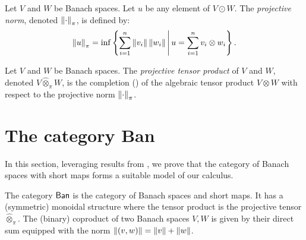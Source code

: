 
\begin{definition} %
  Let $V$ and $W$ be Banach spaces. Let $u$ be any element of $V \odot W$. The \emph{projective norm}, denoted $\left\lVert  \cdot  \right\rVert_{\pi}$,  is defined by: 
  \[
 \left\lVert u \right\rVert_{\pi} = \inf\left\{ \sum_{i=1}^n \left\lVert v_i \right\rVert \left\lVert w_i \right\rVert \Bigg| \, u = \sum_{i=1}^n v_i \otimes w_i\right\}.
\]
\end{definition}


\begin{definition} %
  Let \( V \) and \( W \) be Banach spaces. The \emph{projective tensor product} of \( V \) and \( W \), denoted  $ V \widehat{\otimes}_\pi W$, is the completion (\cite{goubault-larrecqNonHausdorffTopologyDomain2013}) of the algebraic tensor product \( V \otimes W \) with respect to the projective norm \( \left\lVert \cdot \right\rVert_{\pi} \).
\end{definition}







\section{The category Ban}

In this section, leveraging results from \cite{dahlqvist2023syntactic}, we prove that the category of Banach spaces with short maps forms a suitable model of our calculus.

\begin{comment}
\begin{definition}
Let \( x = (x_1, x_2, \dots, x_n) \in \mathbb{C}^n \). The \( L^1 \) norm, \gls{l1_norm},  is defined by
\[
\|x\|_{L^1} = \sum_{i=1}^n |x_i|.
\]
\end{definition}
\end{comment}

\begin{definition}
  The category $\mathsf{Ban}$ is the category of Banach spaces and short maps. It has a (symmetric) monoidal structure  where the tensor product is the projective tensor $\widehat{\otimes}_\pi$.
  The (binary) coproduct of two Banach spaces $V,W$ is given by their direct sum equipped with the norm $\left\lVert (v,w) \right\rVert = \left\lVert v \right\rVert + \left\lVert w \right\rVert$.  
\end{definition}


